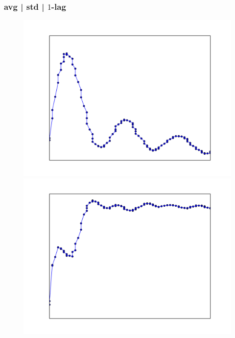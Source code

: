 \documentclass{beamer}
\begin{document}
  \begin{frame}[foot]
    \frametitle{avg | std | $1$-lag}
    \begin{figure}
      \vspace*{-2em}
      {
      \hspace*{-2em}
      {{
      \includegraphics[scale=.28]{./gfx/feature1.png}
      \hspace*{0.1em}
      \includegraphics[scale=.28]{./gfx/feature2.png}
      }
      \vspace*{-1em}
}}
\end{figure}
\end{frame}
\end{document}
